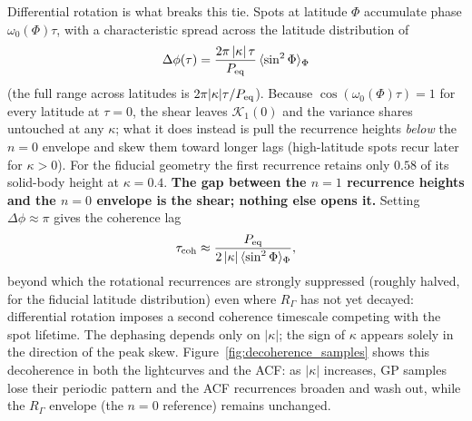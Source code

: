 \documentclass[preprint]{aastex702}
\begin{document}
Differential rotation is what breaks this tie. Spots at latitude $\Phi$ accumulate phase $\omega_0(\Phi)\tau$, with a characteristic spread across the latitude distribution of
\begin{equation}
    \Delta\phi(\tau) = \frac{2\pi\,|\kappa|\,\tau}{P_{\rm eq}}\,\langle \sin^2\Phi \rangle_\Phi
    \label{eq:phase_spread}
\end{equation}
(the full range across latitudes is $2\pi|\kappa|\tau/P_{\rm eq}$). Because $\cos(\omega_0(\Phi)\tau) = 1$ for every latitude at $\tau = 0$, the shear leaves $\mathcal{K}_1(0)$ and the variance shares untouched at any $\kappa$; what it does instead is pull the recurrence heights \emph{below} the $n = 0$ envelope and skew them toward longer lags (high-latitude spots recur later for $\kappa > 0$). For the fiducial geometry the first recurrence retains only $0.58$ of its solid-body height at $\kappa = 0.4$. \textbf{The gap between the $n = 1$ recurrence heights and the $n = 0$ envelope is the shear; nothing else opens it.} Setting $\Delta\phi \approx \pi$ gives the coherence lag
\begin{equation}
    \tau_{\rm coh} \approx \frac{P_{\rm eq}}{2\,|\kappa|\,\langle \sin^2\Phi \rangle_\Phi},
    \label{eq:coherence_lag}
\end{equation}
beyond which the rotational recurrences are strongly suppressed (roughly halved, for the fiducial latitude distribution) even where $R_\Gamma$ has not yet decayed: differential rotation imposes a second coherence timescale competing with the spot lifetime. The dephasing depends only on $|\kappa|$; the sign of $\kappa$ appears solely in the direction of the peak skew. Figure~\ref{fig:decoherence_samples} shows this decoherence in both the lightcurves and the ACF: as $|\kappa|$ increases, GP samples lose their periodic pattern and the ACF recurrences broaden and wash out, while the $R_\Gamma$ envelope (the $n = 0$ reference) remains unchanged.
\end{document}
